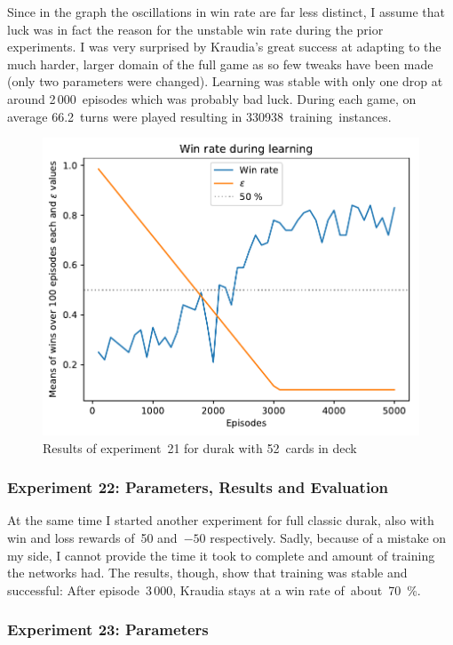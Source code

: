 \documentclass[a4paper,titlepage]{article}
\begin{document}
Since in the graph the oscillations in win rate are far less distinct, I assume that luck was in fact the reason for the unstable win rate during the prior experiments. I was very surprised by Kraudia's great success at adapting to the much harder, larger domain of the full game as so few tweaks have been made (only two parameters were changed). Learning was stable with only one drop at around 2\,000~episodes which was probably bad luck. During each game, on average 66.2~turns were played resulting in 330938~training~instances.
\begin{figure}
  \centering
  \includegraphics[width=\textwidth]{../experiments/exp21/win_stats.pdf}
  \caption{Results of experiment~21 for durak with 52~cards in deck}
  \label{fig:exp21}
\end{figure}

\subsubsection*{Experiment 22: Parameters, Results and Evaluation}

At the same time I started another experiment for full classic durak, also with win and loss rewards of~50 and~$-50$ respectively. Sadly, because of a mistake on my side, I cannot provide the time it took to complete and amount of training the networks had. The results, though, show that training was stable and successful: After episode~3\,000, Kraudia stays at a win rate of~about~70~\%.

\subsubsection*{Experiment 23: Parameters}
\end{document}
